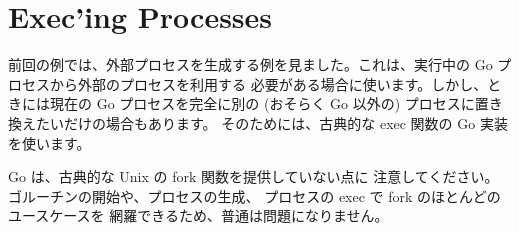 \section{Exec'ing Processes}

前回の例では、外部プロセスを生成する例を見ました。これは、実行中の Go プロセスから外部のプロセスを利用する 必要がある場合に使います。しかし、ときには現在の Go プロセスを完全に別の (おそらく Go 以外の) プロセスに置き換えたいだけの場合もあります。 そのためには、古典的な exec 関数の Go 実装を使います。




Go は、古典的な Unix の fork 関数を提供していない点に 注意してください。ゴルーチンの開始や、プロセスの生成、 プロセスの exec で fork のほとんどのユースケースを 網羅できるため、普通は問題になりません。